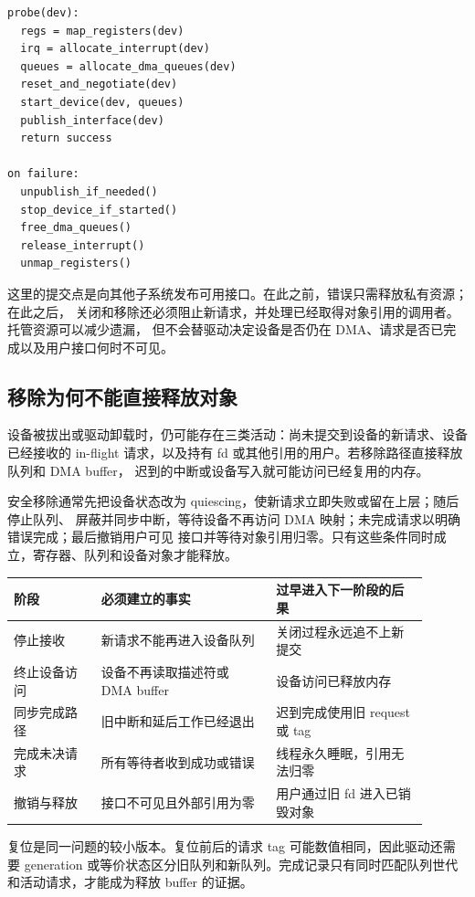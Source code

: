\begin{lstlisting}
probe(dev):
  regs = map_registers(dev)
  irq = allocate_interrupt(dev)
  queues = allocate_dma_queues(dev)
  reset_and_negotiate(dev)
  start_device(dev, queues)
  publish_interface(dev)
  return success

on failure:
  unpublish_if_needed()
  stop_device_if_started()
  free_dma_queues()
  release_interrupt()
  unmap_registers()
\end{lstlisting}

这里的提交点是向其他子系统发布可用接口。在此之前，错误只需释放私有资源；在此之后，
关闭和移除还必须阻止新请求，并处理已经取得对象引用的调用者。托管资源可以减少遗漏，
但不会替驱动决定设备是否仍在 DMA、请求是否已完成以及用户接口何时不可见。

\subsection{移除为何不能直接释放对象}

设备被拔出或驱动卸载时，仍可能存在三类活动：尚未提交到设备的新请求、设备已经接收的
in-flight 请求，以及持有 fd 或其他引用的用户。若移除路径直接释放队列和 DMA buffer，
迟到的中断或设备写入就可能访问已经复用的内存。

安全移除通常先把设备状态改为 quiescing，使新请求立即失败或留在上层；随后停止队列、
屏蔽并同步中断，等待设备不再访问 DMA 映射；未完成请求以明确错误完成；最后撤销用户可见
接口并等待对象引用归零。只有这些条件同时成立，寄存器、队列和设备对象才能释放。

\begin{longtable}{|F{0.19\linewidth}|F{0.38\linewidth}|F{0.33\linewidth}|}
\toprule
{}
阶段 & 必须建立的事实 & 过早进入下一阶段的后果 \\
\midrule
停止接收 & 新请求不能再进入设备队列 & 关闭过程永远追不上新提交 \\\tablerowrule
终止设备访问 & 设备不再读取描述符或 DMA buffer & 设备访问已释放内存 \\\tablerowrule
同步完成路径 & 旧中断和延后工作已经退出 & 迟到完成使用旧 request 或 tag \\\tablerowrule
完成未决请求 & 所有等待者收到成功或错误 & 线程永久睡眠，引用无法归零 \\\tablerowrule
撤销与释放 & 接口不可见且外部引用为零 & 用户通过旧 fd 进入已销毁对象 \\
\bottomrule
\end{longtable}

复位是同一问题的较小版本。复位前后的请求 tag 可能数值相同，因此驱动还需要 generation
或等价状态区分旧队列和新队列。完成记录只有同时匹配队列世代和活动请求，才能成为释放
buffer 的证据。

